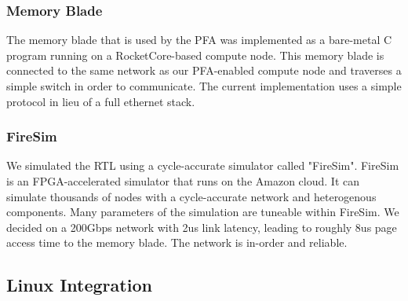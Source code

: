 \subsubsection{Memory Blade}
The memory blade that is used by the PFA was implemented as a bare-metal C
program running on a RocketCore-based compute node. This memory blade is
connected to the same network as our PFA-enabled compute node and traverses a
simple switch in order to communicate. The current implementation uses a simple
protocol in lieu of a full ethernet stack. 

\subsubsection{FireSim}
We simulated the RTL using a cycle-accurate simulator called
"FireSim"\cite{firesim}. FireSim is an FPGA-accelerated simulator that runs on
the Amazon cloud. It can simulate thousands of nodes with a cycle-accurate
network and heterogenous components.  Many parameters of the simulation are
tuneable within FireSim. We decided on a 200Gbps network with 2us link latency,
leading to roughly 8us page access time to the memory blade. The network is
in-order and reliable. 

\subsection{Linux Integration} \label{sec:linuxImpl}
    

